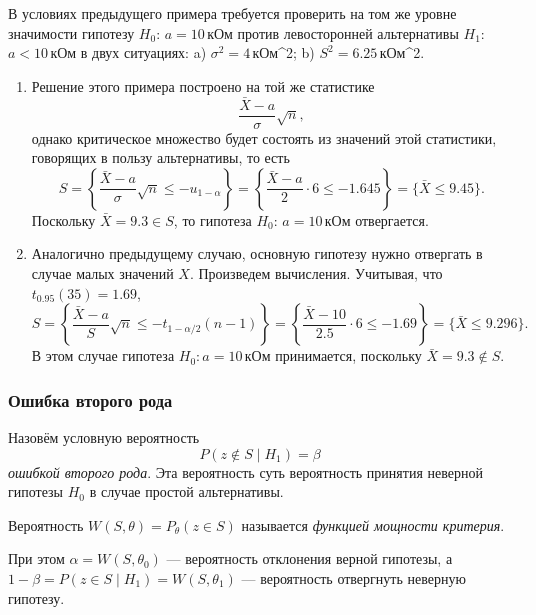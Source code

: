 \begin{ex}\label{ex:2}
	В условиях предыдущего примера требуется проверить на том же уровне значимости
	гипотезу $ H_0 $: $ a = 10 $\,кОм против левосторонней альтернативы $ H_1 $:
	$ a < 10 $\,кОм в двух ситуациях: a) $ \sigma^2 = 4 $\,кОм^2; b) $ S^2 = 6.25
	$\,кОм^2.
	\begin{solution}
		\begin{enumerate}[label=\alph*)]
			\item\label{enum:1} Решение этого примера  построено на той же статистике 
			\[
					\frac{\bar X - a}{\sigma}\sqrt n,
			\]
			однако критическое множество будет состоять из значений этой статистики,
			говорящих в пользу альтернативы, то есть 
			\[
				S = \left\{ \frac{\bar X - a}{\sigma}\sqrt n \leqslant - u_{1-\alpha}
				\right\} = \left\{ \frac{\bar X - a}{2} \cdot 6 \leqslant - 1.645
				\right\} = \{\bar X \leqslant 9.45 \}.
			\]
		Поскольку $ \bar X = 9.3 \in S $, то гипотеза $ H_0 $: $ a = 10 $\,кОм
		отвергается.	
	\item Аналогично предыдущему случаю, основную гипотезу нужно отвергать в случае малых 
		значений $X$. Произведем вычисления. Учитывая, что $ t_{0.95}(35) = 1.69 $,
	\[
		S = \left\{ \frac{\bar X - a}{S}\sqrt n \leqslant -t_{1-\alpha/2}(n-1)
		\right\} = \left\{ \frac{\bar X - 10}{2.5}\cdot 6 \leqslant -1.69 \right\} =
		\{\bar X \leqslant 9.296\}.
	\]
	В этом случае гипотеза $ H_0: a = 10 $\,кОм принимается, поскольку $ \bar X =
	9.3 \notin S$.
		\end{enumerate}

	\end{solution}
\end{ex}

\subsubsection{Ошибка второго рода}
\begin{definition}
Назовём условную вероятность
\[
	P(z\notin S \mid H_1) = \beta
\]
\emph{ошибкой второго рода}. Эта вероятность суть вероятность принятия неверной
гипотезы $ H_0 $ в случае простой альтернативы.
\end{definition}

\begin{definition}
Вероятность $W(S, \theta) = P_\theta(z\in S)$ называется \emph{функцией мощности
критерия}.
\end{definition}

При этом $ \alpha = W(S, \theta_0) $ --- вероятность отклонения верной гипотезы,
а $ 1-\beta = P(z \in S \mid H_1) = W(S, \theta_1) $ --- вероятность отвергнуть
неверную гипотезу.

